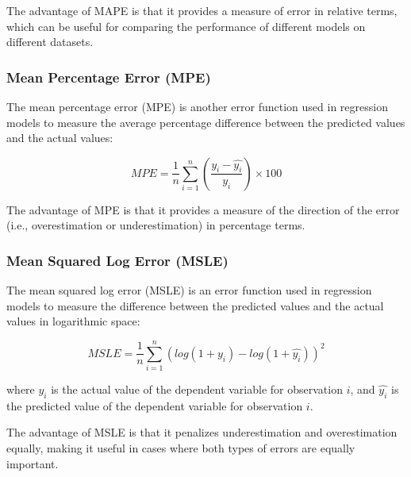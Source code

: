 \documentclass{article}
\begin{document}
The advantage of MAPE is that it provides a measure of error in relative terms, which can be useful for comparing the performance of different models on different datasets.

\subsubsection{Mean Percentage Error (MPE)}
\begin{center}
    \end{center}
The mean percentage error (MPE) is another error function used in regression models to measure the average percentage difference between the predicted values and the actual values:

\begin{equation}
MPE = \frac{1}{n}\sum_{i=1}^{n} \left( \frac{y_i - \hat{y_i}}{y_i} \right) \times 100%
\end{equation}

The advantage of MPE is that it provides a measure of the direction of the error (i.e., overestimation or underestimation) in percentage terms.

\subsubsection{Mean Squared Log Error (MSLE)}
\begin{center}
\end{center}


The mean squared log error (MSLE) is an error function used in regression models to measure the difference between the predicted values and the actual values in logarithmic space:

\begin{equation}
MSLE = \frac{1}{n}\sum_{i=1}^{n}(log(1+y_i) - log(1+\hat{y_i}))^2
\end{equation}

where $y_i$ is the actual value of the dependent variable for observation $i$, and $\hat{y_i}$ is the predicted value of the dependent variable for observation $i$.

The advantage of MSLE is that it penalizes underestimation and overestimation equally, making it useful in cases where both types of errors are equally important.
\end{document}
